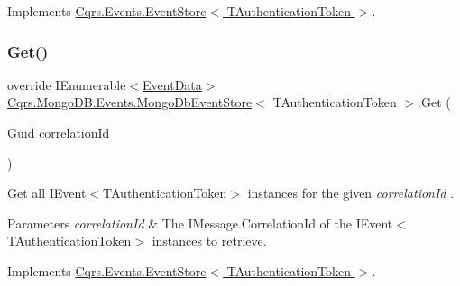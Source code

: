 Implements \hyperlink{classCqrs_1_1Events_1_1EventStore_aa1d0d399a35c1e3b0759e27202695d8b_aa1d0d399a35c1e3b0759e27202695d8b}{Cqrs.\+Events.\+Event\+Store$<$ T\+Authentication\+Token $>$}.

\mbox{\label{classCqrs_1_1MongoDB_1_1Events_1_1MongoDbEventStore_ac886ca0a57ad86cb99ef0a3767db9280_ac886ca0a57ad86cb99ef0a3767db9280}} 
\subsubsection{\texorpdfstring{Get()}{Get()}\hspace{0.1cm}{\footnotesize\ttfamily [2/2]}}
{\footnotesize\ttfamily override I\+Enumerable$<$\hyperlink{classCqrs_1_1Events_1_1EventData}{Event\+Data}$>$ \hyperlink{classCqrs_1_1MongoDB_1_1Events_1_1MongoDbEventStore}{Cqrs.\+Mongo\+D\+B.\+Events.\+Mongo\+Db\+Event\+Store}$<$ T\+Authentication\+Token $>$.Get (\begin{DoxyParamCaption}\item[{Guid}]{correlation\+Id }\end{DoxyParamCaption})\hspace{0.3cm}{\ttfamily [virtual]}}



Get all I\+Event$<$\+T\+Authentication\+Token$>$ instances for the given {\itshape correlation\+Id} . 


\begin{DoxyParams}{Parameters}
{\em correlation\+Id} & The I\+Message.\+Correlation\+Id of the I\+Event$<$\+T\+Authentication\+Token$>$ instances to retrieve.\\
\hline
\end{DoxyParams}


Implements \hyperlink{classCqrs_1_1Events_1_1EventStore_a0096646f5dff730b0041b9469719c420_a0096646f5dff730b0041b9469719c420}{Cqrs.\+Events.\+Event\+Store$<$ T\+Authentication\+Token $>$}.

\mbox{\label{classCqrs_1_1MongoDB_1_1Events_1_1MongoDbEventStore_a95637f6bebb94d505a6b3020275cfdf9_a95637f6bebb94d505a6b3020275cfdf9}} 
